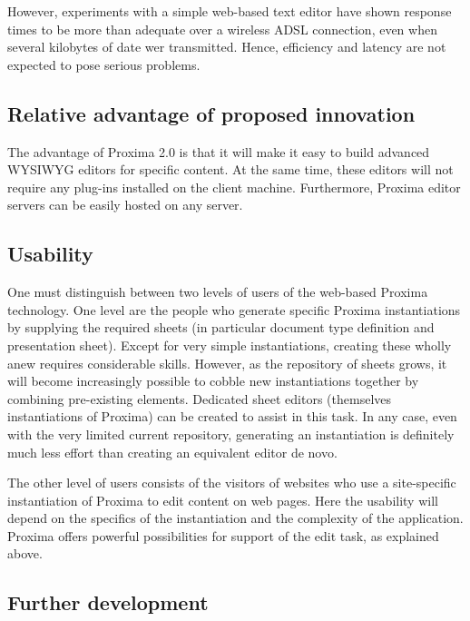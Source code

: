 \documentclass[10pt]{article}
\begin{document}
However, experiments with a simple web-based text editor have shown response times to be more than adequate over a wireless ADSL connection, even when several kilobytes of date wer transmitted. Hence, efficiency and latency are not expected to pose serious problems. 
\ec

\subsection{Relative advantage of proposed innovation}

The advantage of Proxima 2.0 is that it will make it easy to build advanced WYSIWYG editors for specific content. At the same time, these editors will not require any plug-ins installed on the client machine. Furthermore, Proxima editor servers can be easily hosted on any server.


\subsection{Usability}

One must distinguish between two levels of users of the web-based Proxima technology. One level are the people who generate specific Proxima instantiations by supplying the required sheets (in particular document type definition and presentation sheet). Except for very simple instantiations, creating these wholly anew requires considerable skills. However, as the repository of sheets grows, it will become increasingly possible to cobble new instantiations together by combining pre-existing elements.  Dedicated sheet editors (themselves instantiations of Proxima) can be created to assist in this task. In any case, even with the very limited current repository, generating an instantiation is definitely much less effort than creating an equivalent editor de novo.

The other level of users consists of the visitors of websites who use a site-specific instantiation of Proxima to edit content on web pages. Here the usability will depend on the specifics of the instantiation and the complexity of the application. Proxima offers powerful possibilities for support of the edit task, as explained above.



\subsection{Further development}
\end{document}
